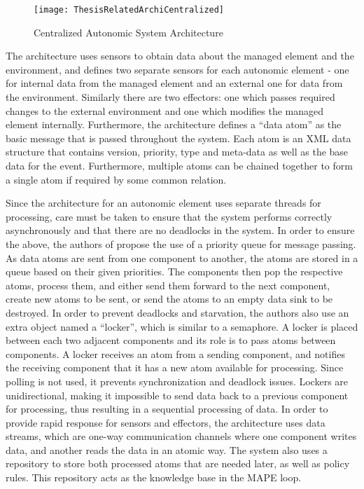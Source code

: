 \begin{figure}
	\centering
		\texttt{[image: ThesisRelatedArchiCentralized]}
	\caption{Centralized Autonomic System Architecture}
	\label{fig:centralizedarchi}
\end{figure}

The architecture uses sensors to obtain data about the managed element and the environment, and defines two separate sensors for each autonomic element - one for internal data from the managed element and an external one for data from the environment. Similarly there are two effectors: one which passes required changes to the external environment and one which modifies the managed element internally. Furthermore, the architecture defines a ``data atom'' as the basic message that is passed throughout the system. Each atom is an XML data structure that contains version, priority, type and meta-data as well as the base data for the event. Furthermore, multiple atoms can be chained together to form a single atom if required by some common relation.

Since the architecture for an autonomic element uses separate threads for processing, care must be taken to ensure that the system performs correctly asynchronously and that there are no deadlocks in the system. In order to ensure the above, the authors of \cite{related:architecture:autonomicelement} propose the use of a priority queue for message passing. As data atoms are sent from one component to another, the atoms are stored in a queue based on their given priorities. The components then pop the respective atoms, process them, and either send them forward to the next component, create new atoms to be sent, or send the atoms to an empty data sink to be destroyed. In order to prevent deadlocks and starvation, the authors also use an extra object named a ``locker'', which is similar to a semaphore. A locker is placed between each two adjacent components and its role is to pass atoms between components. A locker receives an atom from a sending component, and notifies the receiving component that it has a new atom available for processing. Since polling is not used, it prevents synchronization and deadlock issues. Lockers are unidirectional, making it impossible to send data back to a previous component for processing, thus resulting in a sequential processing of data. In order to provide rapid response for sensors and effectors, the architecture uses data streams, which are one-way communication channels where one component writes data, and another reads the data in an atomic way. The system also uses a repository to store both processed atoms that are needed later, as well as policy rules. This repository acts as the knowledge base in the MAPE loop.


